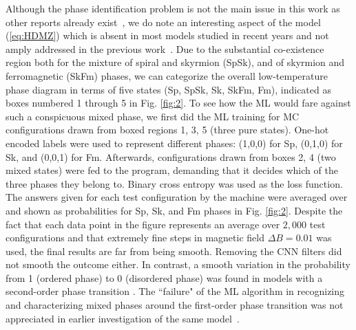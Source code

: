 \documentclass[reprint,amsmath,amssymb,aps,showpacs,superscriptaddress,prl]{revtex4-1}
\begin{document}
Although the phase identification problem is not the main issue in this work as other reports already exist~\cite{russian18}, we do note an interesting aspect of the model (\ref{eq:HDMZ}) which is absent in most models studied in recent years and not amply addressed in the previous work~\cite{russian18}. Due to the substantial co-existence region both for the mixture of spiral and skyrmion (SpSk), and of skyrmion and ferromagnetic (SkFm) phases, we can categorize the overall low-temperature phase diagram in terms of five states (Sp, SpSk, Sk, SkFm, Fm), indicated as boxes numbered 1 through 5 in Fig. \ref{fig:2}. To see how the ML would fare against such a conspicuous mixed phase, we first did the ML training for MC configurations drawn from boxed regions 1, 3, 5 (three pure states). One-hot encoded labels were used to represent different phases: (1,0,0) for Sp, (0,1,0) for Sk, and (0,0,1) for Fm. Afterwards, configurations drawn from boxes 2, 4 (two mixed states) were fed to the program, demanding that it decides which of the three phases they belong to. Binary cross entropy was used as the loss function. The answers given for each test configuration by the machine were averaged over and shown as probabilities for Sp, Sk, and Fm phases  in Fig. \ref{fig:2}. Despite the fact that each data point in the figure represents an average over $2,000$ test configurations and that extremely fine steps in magnetic field $\Delta B= 0.01$ was used, the final results are far from being smooth. Removing the CNN filters did not smooth the outcome either. In contrast, a smooth variation in the probability from 1 (ordered phase) to 0 (disordered phase) was found in models with a second-order phase transition \cite{wang16,melko17,tanaka17,scalettar17,wetzel17,kim18,zhai17,scalettar17,beach18}.
The ``failure" of the ML algorithm in recognizing and characterizing mixed phases around the first-order phase transition was not appreciated in earlier investigation of the same model~\cite{russian18}. 
\end{document}
